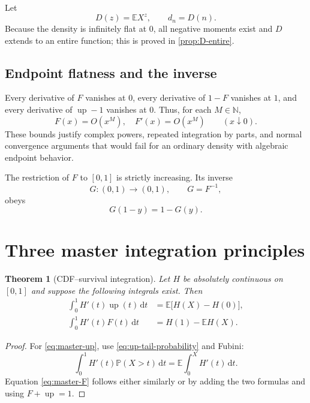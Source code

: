 \documentclass[11pt,oneside]{article}
\newtheorem{theorem}{Theorem}[section]
\theoremstyle{definition}
\theoremstyle{remark}
\newcommand{\N}{\mathbb N}
\newcommand{\E}{\mathbb E}
\newcommand{\Prob}{\mathbb P}
\newcommand{\dd}{\,\mathrm d}
\newcommand{\upf}{\operatorname{up}}
\begin{document}
Let
\begin{equation}\label{eq:D-definition}
 D(z)=\E X^z,
 \qquad d_n=D(n).
\end{equation}
Because the density is infinitely flat at $0$, all negative moments exist and $D$ extends to an entire function; this is proved in \cref{prop:D-entire}.

\subsection{Endpoint flatness and the inverse}

Every derivative of $F$ vanishes at $0$, every derivative of $1-F$ vanishes at $1$, and every derivative of $\upf-1$ vanishes at $0$.  Thus, for each $M\in\N$,
\begin{equation}\label{eq:flatness-bounds}
 F(x)=O(x^M),\quad F'(x)=O(x^M)
 \qquad(x\downarrow0).
\end{equation}
These bounds justify complex powers, repeated integration by parts, and normal convergence arguments that would fail for an ordinary density with algebraic endpoint behavior.

The restriction of $F$ to $[0,1]$ is strictly increasing.  Its inverse
\begin{equation}\label{eq:G-definition}
 G:(0,1)\to(0,1),
 \qquad G=F^{-1},
\end{equation}
obeys
\begin{equation}\label{eq:G-symmetry}
 G(1-y)=1-G(y).
\end{equation}

\section{Three master integration principles}

\begin{theorem}[CDF--survival integration]\label{thm:master-H}
Let $H$ be absolutely continuous on $[0,1]$ and suppose the following integrals exist.  Then
\begin{align}
 \int_0^1H'(t)\upf(t)\dd t
 &=\E\bigl[H(X)-H(0)\bigr],\label{eq:master-up}\\
 \int_0^1H'(t)F(t)\dd t
 &=H(1)-\E H(X).\label{eq:master-F}
\end{align}
\end{theorem}

\begin{proof}
For \eqref{eq:master-up}, use \eqref{eq:up-tail-probability} and Fubini:
\[
 \int_0^1H'(t)\Prob(X>t)\dd t
 =\E\int_0^XH'(t)\dd t.
\]
Equation \eqref{eq:master-F} follows either similarly or by adding the two formulas and using $F+\upf=1$.
\end{proof}
\end{document}
